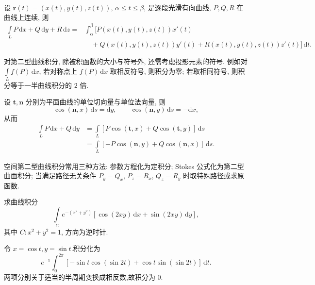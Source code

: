 \begin{theorem}[\markstar]
    设 $\bm r(t)=(x(t),y(t),z(t))$, $\alpha\leq t\leq\beta$, 是逐段光滑有向曲线, $P,Q,R$ 在曲线上连续, 则
    \[
        \begin{aligned}
            \int\limits_L P\,\mathrm{d}x+Q\,\mathrm{d}y+R\,\mathrm{d}z
            ={} & \int_\alpha^\beta\lbrack P(x(t),y(t),z(t))x'(t)                          \\
                & \quad+Q(x(t),y(t),z(t))y'(t)+R(x(t),y(t),z(t))z'(t)\rbrack\,\mathrm{d}t.
        \end{aligned}
    \]
\end{theorem}

\begin{theorem}
    对第二型曲线积分, 除被积函数的大小与符号外, 还需考虑投影元素的符号. 例如对 $\displaystyle\int\limits_L f(P)\,\mathrm{d}x$, 若对称点上 $f(P)\,\mathrm{d}x$ 取相反符号, 则积分为零; 若取相同符号, 则积分等于一半曲线积分的 $2$ 倍.
\end{theorem}

\begin{theorem}
    设 $\bm t,\bm n$ 分别为平面曲线的单位切向量与单位法向量, 则
    \[
        \cos(\bm n,x)\,\mathrm{d}s=\mathrm{d}y,
        \qquad
        \cos(\bm n,y)\,\mathrm{d}s=-\mathrm{d}x,
    \]
    从而
    \[
        \begin{aligned}
            \int\limits_L P\,\mathrm{d}x+Q\,\mathrm{d}y
             & =\int\limits_L\left\lbrack P\cos(\bm t,x)+Q\cos(\bm t,y)\right\rbrack\,\mathrm{d}s   \\
             & =\int\limits_L\left\lbrack -P\cos(\bm n,y)+Q\cos(\bm n,x)\right\rbrack\,\mathrm{d}s.
        \end{aligned}
    \]
\end{theorem}

空间第二型曲线积分常用三种方法: 参数方程化为定积分; Stokes 公式化为第二型曲面积分; 当满足路径无关条件 $P_y=Q_x$, $P_z=R_x$, $Q_z=R_y$ 时取特殊路径或求原函数.

\begin{example}
    求曲线积分
    \[
        \displaystyle\int\limits_C e^{-(x^2+y^2)}\left\lbrack \cos(2xy)\,\mathrm{d}x+\sin(2xy)\,\mathrm{d}y\right\rbrack,
    \]
    其中 $C:x^2+y^2=1$, 方向为逆时针.
\end{example}
\exampleblank

\begin{solution}
    令 $x=\cos t,y=\sin t$.积分化为
    \[
        e^{-1}\int_0^{2\pi}\left[-\sin t\cos(\sin2t)+\cos t\sin(\sin2t)\right]\,\mathrm{d}t.
    \]
    两项分别关于适当的半周期变换成相反数,故积分为 $0$.
\end{solution}


